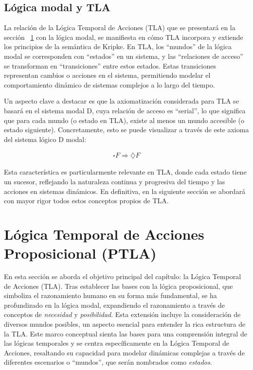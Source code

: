 \subsection{Lógica modal y TLA}\label{subsection:lmodalTLA}
La relación de la Lógica Temporal de Acciones (TLA) que se presentará en la sección ~\ref{section:TLA} con la lógica modal, se manifiesta en cómo TLA incorpora y extiende los principios de la semántica de Kripke. En TLA, los ``mundos'' de la lógica modal se corresponden con ``estados'' en un sistema, y las ``relaciones de acceso'' se transforman en ``transiciones'' entre estos estados. Estas transiciones representan cambios o acciones en el sistema, permitiendo modelar el comportamiento dinámico de sistemas complejos a lo largo del tiempo.

Un aspecto clave a destacar es que la axiomatización considerada para TLA se basará en el sistema modal D, cuya relación de acceso es ``serial'', lo que significa que para cada mundo (o estado en TLA), existe al menos un mundo accesible (o estado siguiente). Concretamente, esto se puede visualizar a través de este axioma del sistema lógico D modal:

\begin{align*}
    \square F \Rightarrow \diamondsuit F
\end{align*}



Esta característica es particularmente relevante en TLA, donde cada estado tiene un sucesor, reflejando la naturaleza continua y progresiva del tiempo y las acciones en sistemas dinámicos. En definitiva, en la siguiente sección se abordará con mayor rigor todos estos conceptos propios de TLA.

\section{Lógica Temporal de Acciones Proposicional (PTLA)}\label{section:TLA}
En esta sección se aborda el objetivo principal del capítulo: la Lógica Temporal de Acciones (TLA). Tras establecer las bases con la lógica proposicional, que simboliza el razonamiento humano en su forma más fundamental, se ha profundizado en la lógica modal, expandiendo el razonamiento a través de conceptos de \textit{necesidad} y \textit{posibilidad}. Esta extensión incluye la consideración de diversos mundos posibles, un aspecto esencial para entender la rica estructura de la TLA. Este marco conceptual sienta las bases para una comprensión integral de las lógicas temporales y se centra específicamente en la Lógica Temporal de Acciones, resaltando su capacidad para modelar dinámicas complejas a través de diferentes escenarios o ``mundos'', que serán nombrados como \textit{estados}.

